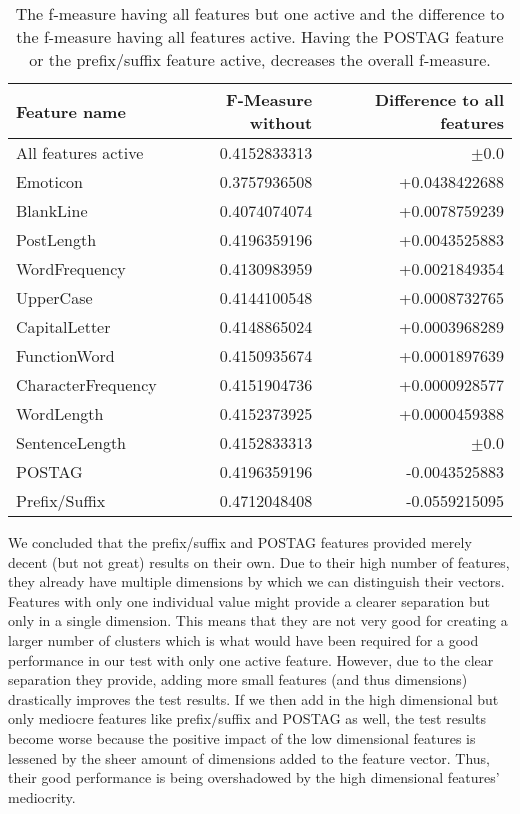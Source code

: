 \begin{table}[h]
	\begin{center}
    \begin{tabular}{l|r|r}
	Feature name		& F-Measure without & Difference to all features \\ \hline \hline
	All features active	& 0.4152833313 & $\pm$0.0 \\ \hline \hline
	Emoticon			& 0.3757936508 & +0.0438422688 \\ \hline
	BlankLine			& 0.4074074074 & +0.0078759239 \\ \hline
	PostLength			& 0.4196359196 & +0.0043525883 \\ \hline
	WordFrequency		& 0.4130983959 & +0.0021849354 \\ \hline
	UpperCase			& 0.4144100548 & +0.0008732765 \\ \hline
	CapitalLetter		& 0.4148865024 & +0.0003968289 \\ \hline
	FunctionWord		& 0.4150935674 & +0.0001897639 \\ \hline
	CharacterFrequency	& 0.4151904736 & +0.0000928577 \\ \hline
	WordLength			& 0.4152373925 & +0.0000459388 \\ \hline
	SentenceLength		& 0.4152833313 & $\pm$0.0 	   \\ \hline
	POSTAG				& 0.4196359196 & -0.0043525883 \\ \hline
	Prefix/Suffix		& 0.4712048408 & -0.0559215095 \\ \hline
    \end{tabular}
    \end{center}
	\caption{The f-measure having all features but one active and the difference to the f-measure having all features active. Having the POSTAG feature or the prefix/suffix feature active, decreases the overall f-measure.}
	\label{tab:feature_evaluation_1}
\end{table}

We concluded that the prefix/suffix and POSTAG features provided merely decent (but not great) results on their own.
Due to their high number of features, they already have multiple dimensions by which we can distinguish their vectors.
Features with only one individual value might provide a clearer separation but only in a single dimension.
This means that they are not very good for creating a larger number of clusters which is what would have been required for a good performance in our test with only one active feature.
However, due to the clear separation they provide, adding more small features (and thus dimensions) drastically improves the test results.
If we then add in the high dimensional but only mediocre features like prefix/suffix and POSTAG as well, the test results become worse because the positive impact of the low dimensional features is lessened by the sheer amount of dimensions added to the feature vector.
Thus, their good performance is being overshadowed by the high dimensional features' mediocrity.


